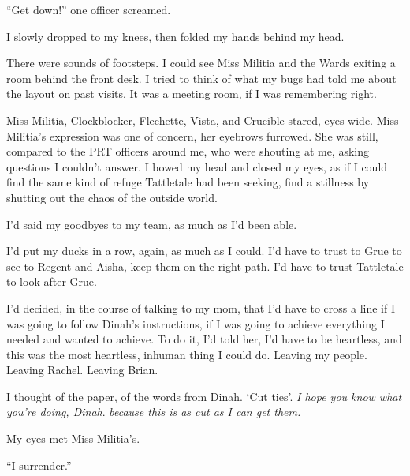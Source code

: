 ``Get down!'' one officer screamed.



I slowly dropped to my knees, then folded my hands behind my head.



There were sounds of footsteps.  I could see Miss Militia and the Wards exiting a room behind the front desk.  I tried to think of what my bugs had told me about the layout on past visits.  It was a meeting room, if I was remembering right.



Miss Militia, Clockblocker, Flechette, Vista, and Crucible stared, eyes wide.  Miss Militia's expression was one of concern, her eyebrows furrowed.  She was still, compared to the PRT officers around me, who were shouting at me, asking questions I couldn't answer.  I bowed my head and closed my eyes, as if I could find the same kind of refuge Tattletale had been seeking, find a stillness by shutting out the chaos of the outside world.



I'd said my goodbyes to my team, as much as I'd been able.



I'd put my ducks in a row, again, as much as I could.  I'd have to trust to Grue to see to Regent and Aisha, keep them on the right path.  I'd have to trust Tattletale to look after Grue.



I'd decided, in the course of talking to my mom, that I'd have to cross a line if I was going to follow Dinah's instructions, if I was going to achieve everything I needed and wanted to achieve.  To do it, I'd told her, I'd have to be heartless, and this was the most heartless, inhuman thing I could do.  Leaving my people.  Leaving Rachel.  Leaving Brian.



I thought of the paper, of the words from Dinah.  `Cut ties'.  \emph{I hope you know what you're doing, Dinah}. \emph{because this is as cut as I can get them.}



My eyes met Miss Militia's.



``I surrender.''





